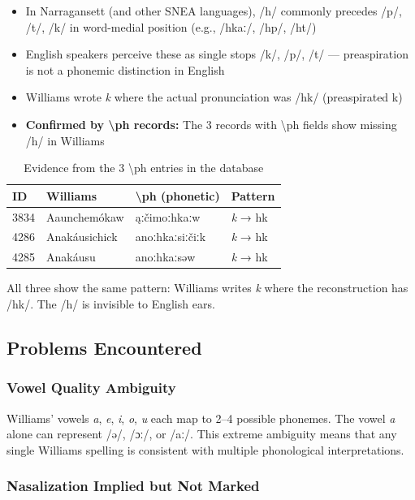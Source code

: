 \begin{itemize}
  \item In Narragansett (and other SNEA languages), /h/ commonly precedes /p/,
    /t/, /k/ in word-medial position (e.g., /hkaː/, /hp/, /ht/)
  \item English speakers perceive these as single stops /k/, /p/, /t/ ---
    preaspiration is not a phonemic distinction in English
  \item Williams wrote \textit{k} where the actual pronunciation was /hk/
    (preaspirated k)
  \item \textbf{Confirmed by \textbackslash ph records:} The 3 records with
    \textbackslash ph fields show missing /h/ in Williams
\end{itemize}

\begin{table}[h]
\centering
\begin{tabular}{llll}
\toprule
ID & Williams & \textbackslash ph (phonetic) & Pattern \\
\midrule
3834 & Aaunchemókaw & ąːčimoːhkaːw & \textit{k} → hk \\
4286 & Anakáusichick & anoːhkaːsiːčiːk & \textit{k} → hk \\
4285 & Anakáusu & anoːhkaːsəw & \textit{k} → hk \\
\bottomrule
\end{tabular}
\caption{Evidence from the 3 \textbackslash ph entries in the database}
\label{tab:1362-ph}
\end{table}

All three show the same pattern: Williams writes \textit{k} where the
reconstruction has /hk/. The /h/ is invisible to English ears.

\subsection{Problems Encountered}

\subsubsection{Vowel Quality Ambiguity}

Williams' vowels \textit{a}, \textit{e}, \textit{i}, \textit{o}, \textit{u}
each map to 2--4 possible phonemes. The vowel \textit{a} alone can represent
/ə/, /ɔː/, or /aː/. This extreme ambiguity means that any single Williams
spelling is consistent with multiple phonological interpretations.

\subsubsection{Nasalization Implied but Not Marked}

